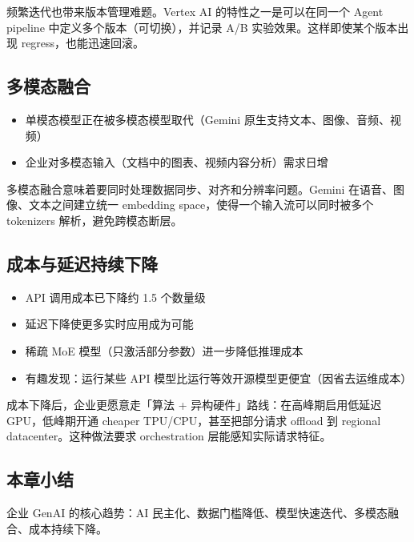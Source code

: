 频繁迭代也带来版本管理难题。Vertex AI 的特性之一是可以在同一个 Agent pipeline 中定义多个版本（可切换），并记录 A/B 实验效果。这样即使某个版本出现 regress，也能迅速回滚。

\subsection{多模态融合}

\begin{itemize}
    \item 单模态模型正在被多模态模型取代（Gemini 原生支持文本、图像、音频、视频）
    \item 企业对多模态输入（文档中的图表、视频内容分析）需求日增
\end{itemize}

多模态融合意味着要同时处理数据同步、对齐和分辨率问题。Gemini 在语音、图像、文本之间建立统一 embedding space，使得一个输入流可以同时被多个 tokenizers 解析，避免跨模态断层。

\subsection{成本与延迟持续下降}

\begin{itemize}
    \item API 调用成本已下降约 1.5 个数量级
    \item 延迟下降使更多实时应用成为可能
    \item 稀疏 MoE 模型（只激活部分参数）进一步降低推理成本
    \item 有趣发现：运行某些 API 模型比运行等效开源模型更便宜（因省去运维成本）
\end{itemize}

成本下降后，企业更愿意走「算法 + 异构硬件」路线：在高峰期启用低延迟 GPU，低峰期开通 cheaper TPU/CPU，甚至把部分请求 offload 到 regional datacenter。这种做法要求 orchestration 层能感知实际请求特征。

\subsection{本章小结}

企业 GenAI 的核心趋势：AI 民主化、数据门槛降低、模型快速迭代、多模态融合、成本持续下降。

